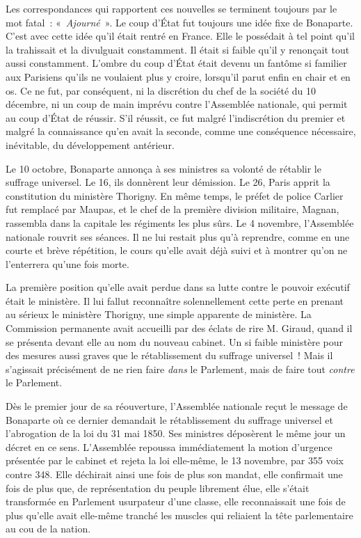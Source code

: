 \documentclass[french,twoside]{book} %
\begin{document}
\noindent Les correspondances qui rapportent ces nouvelles se terminent toujours par le mot fatal : « \emph{Ajourné} ». Le coup d’État fut toujours une idée fixe de Bonaparte. C’est avec cette idée qu’il était rentré en France. Elle le possédait à tel point qu’il la trahissait et la divulguait constamment. Il était si faible qu’il y renonçait tout aussi constamment. L’ombre du coup d’État était devenu un fantôme si familier aux Parisiens qu’ils ne voulaient plus y croire, lorsqu’il parut enfin en chair et en os. Ce ne fut, par conséquent, ni la discrétion du chef de la société du 10 décembre, ni un coup de main imprévu contre l’Assemblée nationale, qui permit au coup d’État de réussir. S’il réussit, ce fut malgré l’indiscrétion du premier et malgré la connaissance qu’en avait la seconde, comme une conséquence nécessaire, inévitable, du développement antérieur.\par
Le 10 octobre, Bonaparte annonça à ses ministres sa volonté de rétablir le suffrage universel. Le 16, ils donnèrent leur démission. Le 26, Paris apprit la constitution du ministère Thorigny. En même temps, le préfet de police Carlier fut remplacé par Maupas, et le chef de la première division militaire, Magnan, rassembla dans la capitale les régiments les plus sûrs. Le 4 novembre, l’Assemblée nationale rouvrit ses séances. Il ne lui restait plus qu’à reprendre, comme en une courte et brève répétition, le cours qu’elle avait déjà suivi et à montrer qu’on ne l’enterrera qu’une fois morte.\par
La première position qu’elle avait perdue dans sa lutte contre le pouvoir exécutif était le ministère. Il lui fallut reconnaître solennellement cette perte en prenant au sérieux le ministère Thorigny, une simple apparente de ministère. La Commission permanente avait accueilli par des éclats de rire M. Giraud, quand il se présenta devant elle au nom du nouveau cabinet. Un si faible ministère pour des mesures aussi graves que le rétablissement du suffrage universel ! Mais il s’agissait précisément de ne rien faire \emph{dans} le Parlement, mais de faire tout \emph{contre} le Parlement.\par
Dès le premier jour de sa réouverture, l’Assemblée nationale reçut le message de Bonaparte où ce dernier demandait le rétablissement du suffrage universel et l’abrogation de la loi du 31 mai 1850. Ses ministres déposèrent le même jour un décret en ce sens. L’Assemblée repoussa immédiatement la motion d’urgence présentée par le cabinet et rejeta la loi elle-même, le 13 novembre, par 355 voix contre 348. Elle déchirait ainsi une fois de plus son mandat, elle confirmait une fois de plus que, de représentation du peuple librement élue, elle s’était transformée en Parlement usurpateur d’une classe, elle reconnaissait une fois de plus qu’elle avait elle-même tranché les muscles qui reliaient la tête parlementaire au cou de la nation.\par
\end{document}
